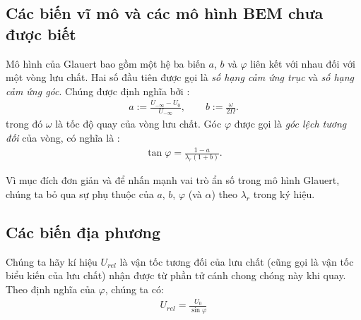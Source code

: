 \documentclass[a4paper,twoside,13pt]{extbook}
\begin{document}
\subsection{Các biến vĩ mô và các mô hình BEM chưa được biết}

Mô hình của Glauert bao gồm một hệ ba biến $a$, $b$ và $\varphi$ liên kết với nhau đối với một vòng lưu chất. Hai số đầu tiên được gọi là \emph{số hạng cảm ứng trục} và \emph{số hạng cảm ứng góc}. Chúng được định nghĩa bởi :
\begin{equation}\label{eq:1_1}
    \begin{aligned}
        a:=\frac{U_{-\infty}-U_0}{U_{-\infty}}, \qquad b:=\frac{\omega}{2\Omega}.
    \end{aligned}
\end{equation}
trong đó $\omega$ là tốc độ quay của vòng lưu chất. Góc $\varphi$ được gọi là \emph{góc lệch tương đối} của vòng, có nghĩa là :
\begin{equation}\label{eq:1_2}
    \begin{aligned}
        \tan \varphi  = \frac{{1 - a}}{{{\lambda _r}\left( {1 + b} \right)}}.
    \end{aligned}
\end{equation}

Vì mục đích đơn giản và để nhấn mạnh vai trò ẩn số trong mô hình Glauert,
chúng ta bỏ qua sự phụ thuộc của $a$, $b$, $\varphi$ (và $\alpha$) theo $\lambda_r$ trong ký hiệu.
\subsection{Các biến địa phương}

Chúng ta hãy kí hiệu $U_{rel}$ là vận tốc tương đối của lưu chất (cũng
gọi là vận tốc biểu kiến của lưu chất) nhận được từ phần tử cánh chong chóng này khi quay. Theo định nghĩa của $\varphi$, chúng ta có:
\begin{equation}\label{eq:1_3}
    \begin{aligned}
        {U_{rel}} = \frac{{{U_0}}}{{\sin \varphi }}
    \end{aligned}
\end{equation}
\end{document}
